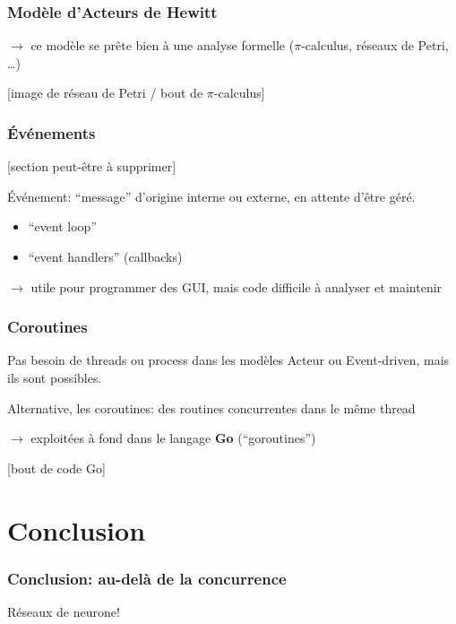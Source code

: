 \documentclass{beamer}
\begin{document}
\begin{frame}
  \frametitle{Modèle d'Acteurs de Hewitt}  
  $\rightarrow$ ce modèle se prête bien à une analyse formelle ($\pi$-calculus,
  réseaux de Petri, \ldots)
  \par
  \begin{center}
        [image de réseau de Petri / bout de $\pi$-calculus]    
  \end{center}
\end{frame}
\begin{frame}
  \frametitle{Événements}
  [section peut-être à supprimer]\medskip
  
  Événement: ``message'' d'origine interne ou externe, en attente d'être géré.
  \begin{itemize}
  \item ``event loop''
  \item ``event handlers'' (callbacks)
  \end{itemize}
  $\rightarrow$ utile pour programmer des GUI, mais code difficile à analyser et maintenir
\end{frame}
\begin{frame}
  \frametitle{Coroutines}
  Pas besoin de threads ou process dans les modèles Acteur ou Event-driven, mais ils sont possibles.
  \par\medskip
  Alternative, les coroutines: des routines concurrentes dans le même thread
  \par\smallskip
  $\rightarrow$ exploitées à fond dans le langage \textbf{Go} (``goroutines'')
  \begin{center}
    [bout de code Go]
  \end{center}
\end{frame}

\section{Conclusion}
\begin{frame}
  \frametitle{Conclusion: au-delà de la concurrence}
  Réseaux de neurone!
\end{frame}
\end{document}
